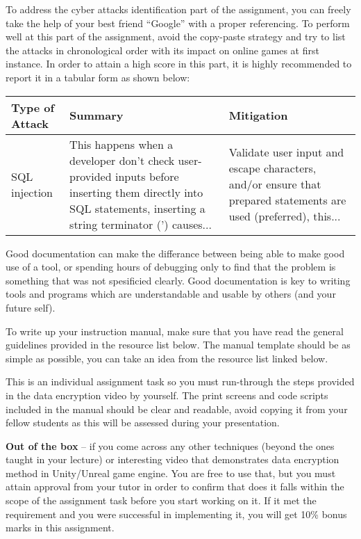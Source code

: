 \documentclass{../../fal_assignment}
\begin{document}
To address the cyber attacks identification part of the assignment, you can freely take
the help of your best friend “Google” with a proper referencing. To perform well at
this part of the assignment, avoid the copy-paste strategy and try to list the attacks
in chronological order with its impact on online games at first instance. In order to
attain a high score in this part, it is highly recommended to report it in a tabular form
as shown below:

\begin{tabular}{lp{}p{}}
  \textbf{Type of Attack} & \textbf{Summary} & \textbf{Mitigation}\\ \hline
  SQL injection & This happens when a developer don't check user-provided inputs before inserting them directly into SQL statements, inserting a string terminator (') causes... & Validate user input and escape characters, and/or ensure that prepared statements are used (preferred), this...\\
\end{tabular}

Good documentation can make the differance between being able to make good use of
a tool, or spending hours of debugging only to find that the problem is something
that was not spesificied clearly. Good documentation is key to writing tools and
programs which are understandable and usable by others (and your future self).

To write up your instruction manual, make sure that you have read the general
guidelines provided in the resource list below. The manual template should be as
simple as possible, you can take an idea from the resource list linked below.

This is an individual assignment task so you must run-through the steps provided in
the data encryption video by yourself. The print screens and code scripts included in
the manual should be clear and readable, avoid copying it from your fellow students
as this will be assessed during your presentation.

\textbf{Out of the box} – if you come across any other techniques (beyond the ones 
taught in your lecture) or interesting video that demonstrates data encryption 
method in Unity/Unreal game engine. You are free to use that, but you must attain approval
from your tutor in order to confirm that does it falls within the scope of the
assignment task before you start working on it. If it met the requirement and you
were successful in implementing it, you will get 10\% bonus marks in this assignment.
\end{document}
